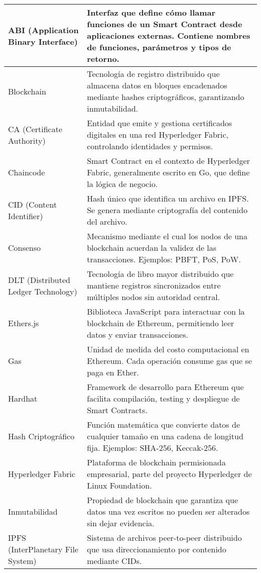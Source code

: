 \begin{longtable}{|p{3.5cm}|p{10.5cm}|}
\hline
\endlastfoot
ABI (Application Binary Interface) & Interfaz que define cómo llamar funciones de un Smart Contract desde aplicaciones externas. Contiene nombres de funciones, parámetros y tipos de retorno. \\ \hline
Blockchain & Tecnología de registro distribuido que almacena datos en bloques encadenados mediante hashes criptográficos, garantizando inmutabilidad. \\ \hline
CA (Certificate Authority) & Entidad que emite y gestiona certificados digitales en una red Hyperledger Fabric, controlando identidades y permisos. \\ \hline
Chaincode & Smart Contract en el contexto de Hyperledger Fabric, generalmente escrito en Go, que define la lógica de negocio. \\ \hline
CID (Content Identifier) & Hash único que identifica un archivo en IPFS. Se genera mediante criptografía del contenido del archivo. \\ \hline
Consenso & Mecanismo mediante el cual los nodos de una blockchain acuerdan la validez de las transacciones. Ejemplos: PBFT, PoS, PoW. \\ \hline
DLT (Distributed Ledger Technology) & Tecnología de libro mayor distribuido que mantiene registros sincronizados entre múltiples nodos sin autoridad central. \\ \hline
Ethers.js & Biblioteca JavaScript para interactuar con la blockchain de Ethereum, permitiendo leer datos y enviar transacciones. \\ \hline
Gas & Unidad de medida del costo computacional en Ethereum. Cada operación consume gas que se paga en Ether. \\ \hline
Hardhat & Framework de desarrollo para Ethereum que facilita compilación, testing y despliegue de Smart Contracts. \\ \hline
Hash Criptográfico & Función matemática que convierte datos de cualquier tamaño en una cadena de longitud fija. Ejemplos: SHA-256, Keccak-256. \\ \hline
Hyperledger Fabric & Plataforma de blockchain permisionada empresarial, parte del proyecto Hyperledger de Linux Foundation. \\ \hline
Inmutabilidad & Propiedad de blockchain que garantiza que datos una vez escritos no pueden ser alterados sin dejar evidencia. \\ \hline
IPFS (InterPlanetary File System) & Sistema de archivos peer-to-peer distribuido que usa direccionamiento por contenido mediante CIDs. \\ \hline

\end{longtable}
